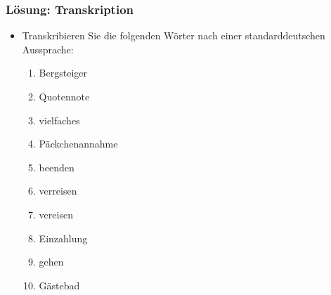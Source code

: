 
\begin{frame}
\frametitle{Lösung: Transkription}

\begin{itemize}

\item Transkribieren Sie die folgenden Wörter nach einer standarddeutschen Aussprache:

	\begin{enumerate}

\settowidth{}

		\item  Bergsteiger
		
		\item  Quotennote
		
		\item  vielfaches
		
		\item  Päckchenannahme
		
		\item  beenden
		
		\item  verreisen
		
		\item  vereisen
		
		\item  Einzahlung
		
		\item  gehen
		
		\item  Gästebad
	\end{enumerate}

\end{itemize}

\end{frame}

